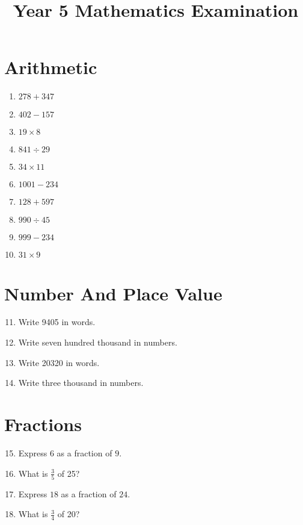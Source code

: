 \documentclass[10pt,a4paper]{article}
\begin{document}
\title{Year 5 Mathematics Examination}
\date{}
\maketitle

\section*{Arithmetic}

\begin{enumerate}
\item $278 + 347$
\item $402 - 157$
\item $19 \times 8$
\item $841 \div 29$
\item $34 \times 11$
\item $1001 - 234$
\item $128 + 597$
\item $990 \div 45$
\item $999 - 234$
\item $31 \times 9$
\end{enumerate}

\section*{Number And Place Value}

\begin{enumerate}
\setcounter{enumi}{10}
\item Write 9405 in words.
\item Write seven hundred thousand in numbers.
\item Write 20320 in words.
\item Write three thousand in numbers.
\end{enumerate}

\section*{Fractions}

\begin{enumerate}
\setcounter{enumi}{14}
\item Express $6$ as a fraction of $9$.
\item What is $\frac{3}{5}$ of 25?
\item Express $18$ as a fraction of $24$.
\item What is $\frac{3}{4}$ of 20?
\end{enumerate}
\end{document}
